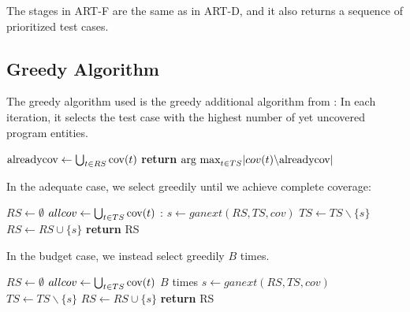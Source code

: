 The stages in ART-F are the same as in ART-D, and it also returns a
sequence of prioritized test cases.

\subsection{Greedy Algorithm}

The greedy algorithm used is the greedy additional algorithm from
\cite{rothermel2001prioritizing}: In each iteration, it selects the test
case with the highest number of yet uncovered program entities.

\begin{algorithm}
\begin{algorithmic}
	\State $\hbox{alreadycov} \gets \bigcup_{t \in RS} \hbox{cov}(t)$
	\State \textbf{return} $\hbox{arg max}_{t \in TS} |cov(t)\backslash \hbox{alreadycov}|$
\EndFunction
\end{algorithmic}
\end{algorithm}

In the adequate case, we select greedily until we achieve complete
coverage:

\begin{algorithm}
\begin{algorithmic}
	\State $RS \gets \emptyset$
	\State $allcov \gets \bigcup_{t \in TS} \hbox{cov}(t)$
	:
		\State $s \gets ganext(RS, TS, cov)$
		\State $TS \gets TS \backslash \{s\}$
		\State $RS \gets RS \cup \{s\}$
	\EndWhile
	\State \textbf{return} RS
\EndFunction
\end{algorithmic}
\end{algorithm}

In the budget case, we instead select greedily $B$ times.

\begin{algorithm}
\begin{algorithmic}
	\State $RS \gets \emptyset$
	\State $allcov \gets \bigcup_{t \in TS} \hbox{cov}(t)$
	\For $B$ times
		\State $s \gets ganext(RS, TS, cov)$
		\State $TS \gets TS \backslash \{s\}$
		\State $RS \gets RS \cup \{s\}$
	\EndFor
	\State \textbf{return} RS
\EndFunction
\end{algorithmic}
\end{algorithm}

